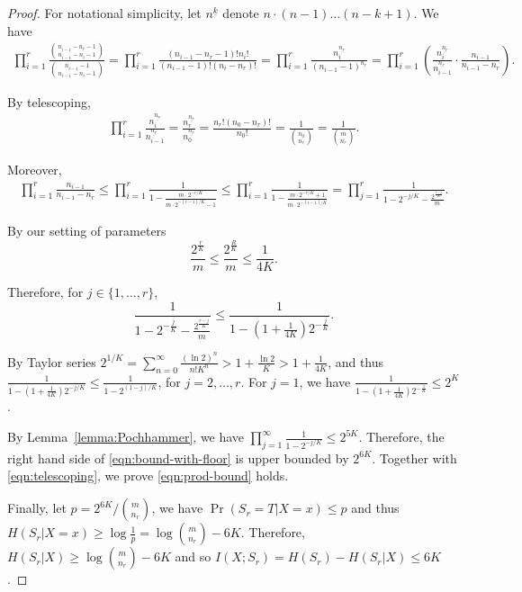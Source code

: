\begin{proof}
  For notational simplicity, let $n^{\underline{k}}$ denote $n\cdot (n-1)\ldots (n-k+1)$. We have 
  \begin{align}
    \prod_{i=1}^{r}{\frac{{n_{i-1}-n_r-1 \choose n_{i-1}-n_i-1}}{{n_{i-1}-1 \choose n_{i-1}-n_i-1}}}
    =\prod_{i=1}^{r}\frac{(n_{i-1}-n_r-1)!n_i!}{(n_{i-1}-1)!(n_i-n_r)!}
    =\prod_{i=1}^{r}\frac{n_i^{\underline{n_r}}}{(n_{i-1}-1)^{\underline{n_r}}}
    =\prod_{i=1}^{r} \left( \frac{n_i^{\underline{n_r}}}{n_{i-1}^{\underline{n_r}}}\cdot \frac{n_{i-1}}{n_{i-1}-n_r} \right).
  \end{align}
  
  By telescoping,
  \begin{align}
    \prod_{i=1}^{r} \frac{n_i^{\underline{n_r}}}{n_{i-1}^{\underline{n_r}}}
    =\frac{n_r^{\underline{n_r}}}{n_0^{\underline{n_r}}}
    =\frac{n_r!(n_0-n_r)!}{n_0!}=\frac{1}{{n_0 \choose n_r}}
    =\frac{1}{{m \choose n_r}}.
    \label{eqn:telescoping}
  \end{align}
  
  Moreover, 
  \begin{align}
    \prod_{i=1}^{r} \frac{n_{i-1}}{n_{i-1}-n_r}
    \le\prod_{i=1}^{r} \frac{1}{1-\frac{m\cdot 2^{-r/K}}{m\cdot 2^{-(i-1)/K}-1}}
    \le\prod_{i=1}^{r} \frac{1}{1-\frac{m\cdot 2^{-r/K}+1}{m\cdot 2^{-(i-1)/K}}}
    =\prod_{j=1}^{r} \frac{1}{1-2^{-j/K}-\frac{2^{\frac{r-j}{K}}}m}.
    \label{eqn:bound-with-floor}
  \end{align}
  
  By our setting of parameters 
  $$\frac{2^{\frac rK}}m \le \frac{2^{\frac RK}}m \le \frac{1}{4K} .$$
  
  Therefore, for $j\in \{1,\ldots, r\}$,
  $$\frac{1}{1-2^{-\frac jK}-\frac{2^{\frac{r-j}{K}}}m}\le \frac{1}{1-(1+\frac{1}{4K})2^{-\frac jK}}.$$ 
  
  By Taylor series $2^{1/K} = \sum_{n=0}^{\infty}{\frac{(\ln 2 )^n}{n!K^n}} >1+\frac{\ln 2}{K}>1+\frac{1}{4K}$, and thus $\frac{1}{1-(1+\frac{1}{4K})2^{-j/K}}\le \frac{1}{1-2^{(1-j)/K}}$, for $j=2,\ldots, r$. For $j=1$, we have $\frac{1}{1-(1+\frac{1}{4K})2^{-\frac 1K}} \le 2^K$.
  
  By Lemma~\ref{lemma:Pochhammer}, we have $\prod_{j=1}^{\infty} \frac{1}{1-2^{-j/K}}\le 2^{5K}$. Therefore, the right hand side of \eqref{eqn:bound-with-floor} is upper bounded by $2^{6K}$. Together with \eqref{eqn:telescoping}, we prove \eqref{eqn:prod-bound} holds.  
  
  Finally, let $p={2^{6K}}/{{m\choose n_r}}$, we have $\Pr(S_r=T|X=x)\le p$ and thus $H(S_r|X=x)\ge \log\frac{1}{p}=\log{{m\choose n_r}}-6K$. Therefore, $H(S_r|X)\ge \log{{m\choose n_r}}-6K$ and so $I(X;S_r)=H(S_r)-H(S_r|X)\le 6K$.  
\end{proof}

